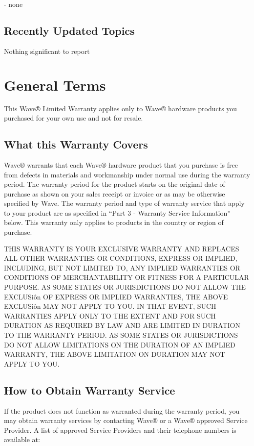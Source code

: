 \documentclass[letterpaper,10pt,english]{sphinxmanual}
\begin{document}
 - none


\subsection{Recently Updated Topics}
\label{\detokenize{releasenotes:recently-updated-topics}}
Nothing significant to report


\section{General Terms}
\label{\detokenize{part1:general-terms}}\label{\detokenize{part1::doc}}
This Wave® Limited Warranty applies only to Wave® hardware products you purchased for your own use and not for resale.


\subsection{What this Warranty Covers}
\label{\detokenize{part1:what-this-warranty-covers}}
Wave® warrants that each Wave® hardware product that you purchase is free from defects in materials and workmanship under normal use during the warranty period. The warranty period for the product starts on the original date of purchase as shown on your sales receipt or invoice or as may be otherwise specified by Wave. The warranty period and type of warranty service that apply to your product are as specified in “Part 3 - Warranty Service Information” below. This warranty only applies to products in the country or region of purchase.

THIS WARRANTY IS YOUR EXCLUSIVE WARRANTY AND REPLACES ALL OTHER WARRANTIES OR CONDITIONS, EXPRESS OR IMPLIED, INCLUDING, BUT NOT LIMITED TO, ANY IMPLIED WARRANTIES OR CONDITIONS OF MERCHANTABILITY OR FITNESS FOR A PARTICULAR PURPOSE. AS SOME STATES OR JURISDICTIONS DO NOT ALLOW THE EXCLUSiôn OF EXPRESS OR IMPLIED WARRANTIES, THE ABOVE EXCLUSiôn MAY NOT APPLY TO YOU. IN THAT EVENT, SUCH WARRANTIES APPLY ONLY TO THE EXTENT AND FOR SUCH DURATION AS REQUIRED BY LAW AND ARE LIMITED IN DURATION TO THE WARRANTY PERIOD. AS SOME STATES OR JURISDICTIONS DO NOT ALLOW LIMITATIONS ON THE DURATION OF AN IMPLIED WARRANTY, THE ABOVE LIMITATION ON DURATION MAY NOT APPLY TO YOU.


\subsection{How to Obtain Warranty Service}
\label{\detokenize{part1:how-to-obtain-warranty-service}}
If the product does not function as warranted during the warranty period, you may obtain warranty services by contacting Wave® or a Wave® approved Service Provider. A list of approved Service Providers and their telephone numbers is available at: 
\end{document}
